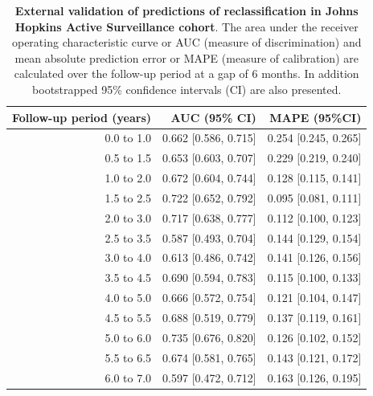 \begin{table}[!htb]
\small\sf\centering
\caption{\textbf{External validation of predictions of reclassification in Johns Hopkins Active Surveillance cohort}. The area under the receiver operating characteristic curve or AUC (measure of discrimination) and mean absolute prediction error or MAPE (measure of calibration) are calculated over the follow-up period at a gap of 6 months. In addition bootstrapped 95\% confidence intervals (CI) are also presented.}
\label{tab:AUC_PE_Hopkins}
\begin{tabular}{r|r|r}
\hline
\hline
Follow-up period (years) & AUC (95\% CI) & MAPE (95\%CI)\\ 
\hline
0.0 to 1.0 & 0.662 [0.586, 0.715] & 0.254 [0.245, 0.265]\\
0.5 to 1.5 & 0.653 [0.603, 0.707] & 0.229 [0.219, 0.240]\\
1.0 to 2.0 & 0.672 [0.604, 0.744] & 0.128 [0.115, 0.141]\\
1.5 to 2.5 & 0.722 [0.652, 0.792] & 0.095 [0.081, 0.111]\\
2.0 to 3.0 & 0.717 [0.638, 0.777] & 0.112 [0.100, 0.123]\\
2.5 to 3.5 & 0.587 [0.493, 0.704] & 0.144 [0.129, 0.154]\\
3.0 to 4.0 & 0.613 [0.486, 0.742] & 0.141 [0.126, 0.156]\\
3.5 to 4.5 & 0.690 [0.594, 0.783] & 0.115 [0.100, 0.133]\\
4.0 to 5.0 & 0.666 [0.572, 0.754] & 0.121 [0.104, 0.147]\\
4.5 to 5.5 & 0.688 [0.519, 0.779] & 0.137 [0.119, 0.161]\\
5.0 to 6.0 & 0.735 [0.676, 0.820] & 0.126 [0.102, 0.152]\\
5.5 to 6.5 & 0.674 [0.581, 0.765] & 0.143 [0.121, 0.172]\\
6.0 to 7.0 & 0.597 [0.472, 0.712] & 0.163 [0.126, 0.195]\\
\hline
\end{tabular}	
\end{table}

